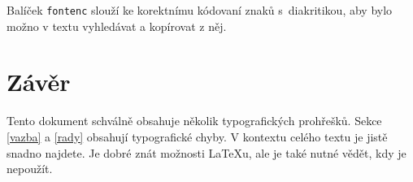 \documentclass[a4paper,twocolumn]{article}[20-02-2022]
\begin{document}
Balíček \texttt{fontenc} slouží ke korektnímu kódovaní znaků s~diakritikou, aby bylo možno v textu vyhledávat a kopírovat z něj.


\section{Závěr}
Tento dokument schválně obsahuje několik typografických prohřešků.
Sekce \ref{vazba} a \ref{rady} obsahují typografické chyby.
V kontextu celého textu je jistě snadno najdete.
Je dobré znát možnosti \LaTeX u, ale je také nutné vědět, kdy je nepoužít.
\end{document}
